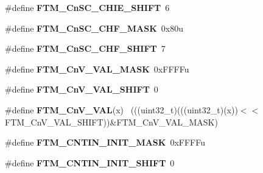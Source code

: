 \begin{DoxyCompactItemize}
\item 
\hypertarget{group___f_t_m___register___masks_gaaba90b1420259332e1f67aa63aa8e560}{}\#define {\bfseries F\+T\+M\+\_\+\+Cn\+S\+C\+\_\+\+C\+H\+I\+E\+\_\+\+S\+H\+I\+F\+T}~6\label{group___f_t_m___register___masks_gaaba90b1420259332e1f67aa63aa8e560}

\item 
\hypertarget{group___f_t_m___register___masks_ga16fe13e36069f8d764bbb9bad111001f}{}\#define {\bfseries F\+T\+M\+\_\+\+Cn\+S\+C\+\_\+\+C\+H\+F\+\_\+\+M\+A\+S\+K}~0x80u\label{group___f_t_m___register___masks_ga16fe13e36069f8d764bbb9bad111001f}

\item 
\hypertarget{group___f_t_m___register___masks_gad3f83c62029e371ae120c576015212bb}{}\#define {\bfseries F\+T\+M\+\_\+\+Cn\+S\+C\+\_\+\+C\+H\+F\+\_\+\+S\+H\+I\+F\+T}~7\label{group___f_t_m___register___masks_gad3f83c62029e371ae120c576015212bb}

\item 
\hypertarget{group___f_t_m___register___masks_gaebf50ac59c7cc0b853a2a90b117ac395}{}\#define {\bfseries F\+T\+M\+\_\+\+Cn\+V\+\_\+\+V\+A\+L\+\_\+\+M\+A\+S\+K}~0x\+F\+F\+F\+Fu\label{group___f_t_m___register___masks_gaebf50ac59c7cc0b853a2a90b117ac395}

\item 
\hypertarget{group___f_t_m___register___masks_ga763735cc078e7480124e33026ff2fa22}{}\#define {\bfseries F\+T\+M\+\_\+\+Cn\+V\+\_\+\+V\+A\+L\+\_\+\+S\+H\+I\+F\+T}~0\label{group___f_t_m___register___masks_ga763735cc078e7480124e33026ff2fa22}

\item 
\hypertarget{group___f_t_m___register___masks_ga40e4f4b5e56545a820324e7ec12ecd97}{}\#define {\bfseries F\+T\+M\+\_\+\+Cn\+V\+\_\+\+V\+A\+L}(x)                                                  ~(((uint32\+\_\+t)(((uint32\+\_\+t)(x))$<$$<$F\+T\+M\+\_\+\+Cn\+V\+\_\+\+V\+A\+L\+\_\+\+S\+H\+I\+F\+T))\&F\+T\+M\+\_\+\+Cn\+V\+\_\+\+V\+A\+L\+\_\+\+M\+A\+S\+K)\label{group___f_t_m___register___masks_ga40e4f4b5e56545a820324e7ec12ecd97}

\item 
\hypertarget{group___f_t_m___register___masks_ga5181f522d645ce312209c2258a1a06d0}{}\#define {\bfseries F\+T\+M\+\_\+\+C\+N\+T\+I\+N\+\_\+\+I\+N\+I\+T\+\_\+\+M\+A\+S\+K}~0x\+F\+F\+F\+Fu\label{group___f_t_m___register___masks_ga5181f522d645ce312209c2258a1a06d0}

\item 
\hypertarget{group___f_t_m___register___masks_ga174caa0423e0d00ae66b8adc3253ce60}{}\#define {\bfseries F\+T\+M\+\_\+\+C\+N\+T\+I\+N\+\_\+\+I\+N\+I\+T\+\_\+\+S\+H\+I\+F\+T}~0\label{group___f_t_m___register___masks_ga174caa0423e0d00ae66b8adc3253ce60}


\end{DoxyCompactItemize}
